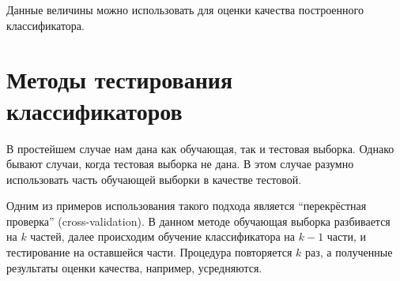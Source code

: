 Данные величины можно использовать для оценки качества построенного классификатора.

\section{Методы тестирования классификаторов}
В простейшем случае нам дана как обучающая, так и тестовая выборка. Однако бывают случаи, когда тестовая выборка не дана. В этом случае разумно использовать часть обучающей выборки в качестве тестовой. 

Одним из примеров использования такого подхода является ``перекрёстная проверка'' (cross-validation). В данном методе обучающая выборка разбивается на $k$ частей, далее происходим обучение классификатора на $k-1$ части, и тестирование на оставшейся части. Процедура повторяется $k$ раз, а полученные результаты оценки качества, например, усредняются.